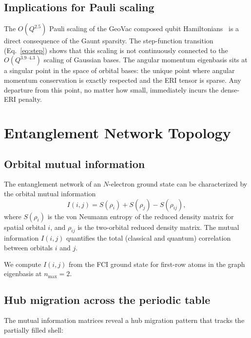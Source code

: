 \documentclass[twocolumn,pra,amsmath,amssymb,superscriptaddress]{revtex4-2}
\begin{document}
\subsection{Implications for Pauli scaling}

The $O(Q^{2.5})$ Pauli scaling of the GeoVac composed qubit
Hamiltonians~\cite{GeoVac_Paper14} is a direct consequence of
the Gaunt sparsity.  The step-function transition
(Eq.~\ref{eq:step}) shows that this scaling is not continuously
connected to the $O(Q^{3.9\text{--}4.3})$ scaling of Gaussian
bases.  The angular momentum eigenbasis sits at a singular point
in the space of orbital bases: the unique point where angular
momentum conservation is exactly respected and the ERI tensor
is sparse.  Any departure from this point, no matter how small,
immediately incurs the dense-ERI penalty.

\section{Entanglement Network Topology}
\label{sec:network}

\subsection{Orbital mutual information}

The entanglement network of an $N$-electron ground state can be
characterized by the orbital mutual information~\cite{Rissler2006,
Boguslawski2012}
\begin{equation}
  I(i, j) = S(\rho_i) + S(\rho_j) - S(\rho_{ij}),
  \label{eq:mi}
\end{equation}
where $S(\rho_i)$ is the von Neumann entropy of the reduced
density matrix for spatial orbital $i$, and $\rho_{ij}$ is the
two-orbital reduced density matrix.  The mutual information
$I(i, j)$ quantifies the total (classical and quantum) correlation
between orbitals $i$ and $j$.

We compute $I(i, j)$ from the FCI ground state for first-row atoms
in the graph eigenbasis at $n_{\max} = 2$.

\subsection{Hub migration across the periodic table}

The mutual information matrices reveal a hub migration pattern
that tracks the partially filled shell:
\end{document}
